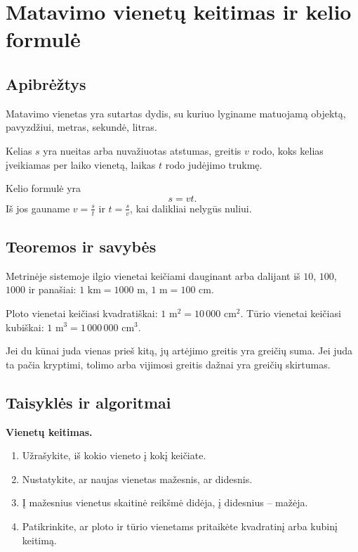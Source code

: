 \section{Matavimo vienetų keitimas ir kelio formulė}\label{sec:matavimo-vienetu-keitimas-ir-kelio-formule}

\subsection{Apibrėžtys}
\begin{apibreztis}
Matavimo vienetas yra sutartas dydis, su kuriuo lyginame matuojamą objektą, pavyzdžiui, metras, sekundė, litras.
\end{apibreztis}
\begin{apibreztis}
Kelias \(s\) yra nueitas arba nuvažiuotas atstumas, greitis \(v\) rodo, koks kelias įveikiamas per laiko vienetą, laikas \(t\) rodo judėjimo trukmę.
\end{apibreztis}
\begin{apibreztis}
Kelio formulė yra
\[
s=vt.
\]
Iš jos gauname \(v=\frac{s}{t}\) ir \(t=\frac{s}{v}\), kai dalikliai nelygūs nuliui.
\end{apibreztis}

\subsection{Teoremos ir savybės}
\begin{savybe}
Metrinėje sistemoje ilgio vienetai keičiami dauginant arba dalijant iš \(10\), \(100\), \(1000\) ir panašiai: \(1\text{ km}=1000\text{ m}\), \(1\text{ m}=100\text{ cm}\).
\end{savybe}
\begin{savybe}
Ploto vienetai keičiasi kvadratiškai: \(1\text{ m}^2=10\,000\text{ cm}^2\). Tūrio vienetai keičiasi kubiškai: \(1\text{ m}^3=1\,000\,000\text{ cm}^3\).
\end{savybe}
\begin{savybe}
Jei du kūnai juda vienas prieš kitą, jų artėjimo greitis yra greičių suma. Jei juda ta pačia kryptimi, tolimo arba vijimosi greitis dažnai yra greičių skirtumas.
\end{savybe}

\subsection{Taisyklės ir algoritmai}
\textbf{Vienetų keitimas.}
\begin{enumerate}[label=\arabic*.]
\item Užrašykite, iš kokio vieneto į kokį keičiate.
\item Nustatykite, ar naujas vienetas mažesnis, ar didesnis.
\item Į mažesnius vienetus skaitinė reikšmė didėja, į didesnius -- mažėja.
\item Patikrinkite, ar ploto ir tūrio vienetams pritaikėte kvadratinį arba kubinį keitimą.
\end{enumerate}


